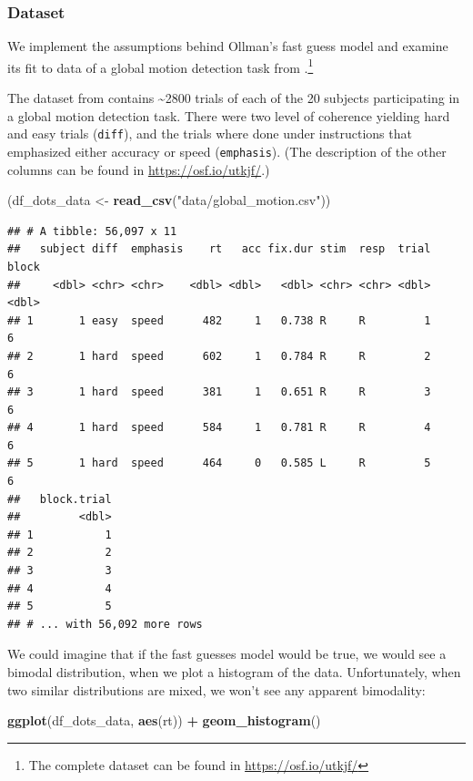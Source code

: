 \documentclass[12pt,]{krantz}
\newenvironment{Shaded}{\begin{snugshade}}{\end{snugshade}}
\newcommand{\KeywordTok}[1]{\textcolor[rgb]{0.13,0.29,0.53}{\textbf{#1}}}
\newcommand{\StringTok}[1]{\textcolor[rgb]{0.31,0.60,0.02}{#1}}
\newcommand{\OperatorTok}[1]{\textcolor[rgb]{0.81,0.36,0.00}{\textbf{#1}}}
\newcommand{\NormalTok}[1]{#1}
\theoremstyle{definition}
\theoremstyle{definition}
\theoremstyle{definition}
\theoremstyle{remark}
\begin{document}
\subsubsection{Dataset}\label{dataset}

We implement the assumptions behind Ollman's fast guess model and
examine its fit to data of a global motion detection task from
\citet{Dutilh2019quality}.\footnote{The complete dataset can be found in
  \url{https://osf.io/utkjf/}}

The dataset from \citet{Dutilh2019quality} contains
\textasciitilde{}2800 trials of each of the 20 subjects participating in
a global motion detection task. There were two level of coherence
yielding hard and easy trials (\texttt{diff}), and the trials where done
under instructions that emphasized either accuracy or speed
(\texttt{emphasis}). (The description of the other columns can be found
in \url{https://osf.io/utkjf/}.)

\begin{Shaded}
\begin{Highlighting}[]
\NormalTok{(df_dots_data <-}\StringTok{ }\KeywordTok{read_csv}\NormalTok{(}\StringTok{"data/global_motion.csv"}\NormalTok{))}
\end{Highlighting}
\end{Shaded}

\begin{verbatim}
## # A tibble: 56,097 x 11
##   subject diff  emphasis    rt   acc fix.dur stim  resp  trial block
##     <dbl> <chr> <chr>    <dbl> <dbl>   <dbl> <chr> <chr> <dbl> <dbl>
## 1       1 easy  speed      482     1   0.738 R     R         1     6
## 2       1 hard  speed      602     1   0.784 R     R         2     6
## 3       1 hard  speed      381     1   0.651 R     R         3     6
## 4       1 hard  speed      584     1   0.781 R     R         4     6
## 5       1 hard  speed      464     0   0.585 L     R         5     6
##   block.trial
##         <dbl>
## 1           1
## 2           2
## 3           3
## 4           4
## 5           5
## # ... with 56,092 more rows
\end{verbatim}

We could imagine that if the fast guesses model would be true, we would
see a bimodal distribution, when we plot a histogram of the data.
Unfortunately, when two similar distributions are mixed, we won't see
any apparent bimodality:

\begin{Shaded}
\begin{Highlighting}[]
\KeywordTok{ggplot}\NormalTok{(df_dots_data, }\KeywordTok{aes}\NormalTok{(rt)) }\OperatorTok{+}
\StringTok{  }\KeywordTok{geom_histogram}\NormalTok{()}
\end{Highlighting}
\end{Shaded}
\end{document}
